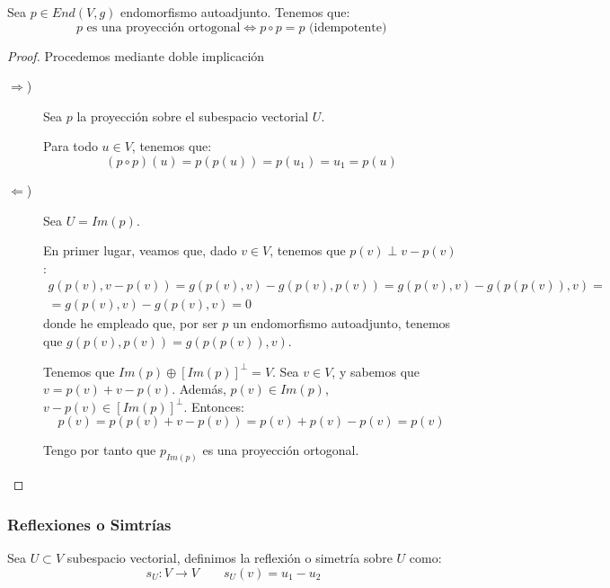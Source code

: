 \begin{prop}
    Sea $p\in End(V, g)$ endomorfismo autoadjunto. Tenemos que:
    \begin{equation*}
        \text{$p$ es una proyección ortogonal} \Longleftrightarrow p\circ p=p \text{ (idempotente) }
    \end{equation*}
\end{prop}
\begin{proof} Procedemos mediante doble implicación
    \begin{description}
        \item [$\Longrightarrow$)]
        Sea $p$ la proyección sobre el subespacio vectorial $U$.
        
        Para todo $u\in V$, tenemos que:
        \begin{equation*}
            (p\circ p)(u)=p(p(u))=p(u_1)=u_1=p(u)
        \end{equation*}

        \item [$\Longleftarrow$)] Sea $U=Im(p)$.

        En primer lugar, veamos que, dado $v\in V$, tenemos que $p(v)\perp v-p(v)$:
        \begin{multline*}
            g(p(v), v-p(v)) = g(p(v), v) - g(p(v),p(v))
            = g(p(v), v) - g(p(p(v)),v) =\\= 
            g(p(v), v) - g(p(v), v) = 0
        \end{multline*}
        donde he empleado que, por ser $p$ un endomorfismo autoadjunto, tenemos que $g(p(v), p(v)) = g(p(p(v)), v)$.

        Tenemos que $Im(p)\oplus [Im(p)]^\perp=V$. Sea $v \in V$, y sabemos que $v = p(v)+v-p(v)$. Además, $p(v)\in Im(p)$, $v-p(v)\in [Im(p)]^\perp$. Entonces:
        \begin{equation*}
            p(v) = p(p(v)+v-p(v)) = p(v) + p(v) -p(v) = p(v)
        \end{equation*}
        
        Tengo por tanto que $p_{Im(p)}$ es una proyección ortogonal.
    \end{description}
\end{proof}

\subsubsection{Reflexiones o Simtrías}
\begin{definicion}
Sea $U\subset V$ subespacio vectorial, definimos la reflexión o simetría sobre $U$ como:
\begin{equation*}
    s_U:V\to V \qquad s_U(v) = u_1 - u_2
\end{equation*}
\end{definicion}

